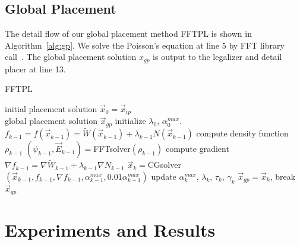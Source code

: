 \documentclass[conference,10pt]{IEEEtran}
\begin{document}
\subsection{Global Placement}
\label{subsec:gp_flow}

The detail flow of our global placement method FFTPL 
is shown in Algorithm~\ref{alg:gp}. 
We solve the Poisson's equation 
at line 5 by FFT library call~\cite{fft}. 
The global placement solution $x_{gp}$ is output to the legalizer 
and detail placer at line 13. 
\begin{algorithm}
\caption{FFTPL}
\label{alg:gp}
\begin{algorithmic}[1]
\REQUIRE 
initial placement solution $\vec{x}_0=\vec{x}_{ip}$ \\
\ENSURE
global placement solution $\vec{x}_{gp}$
\STATE initialize $\lambda_0$, $\alpha^{max}_0$. 
\STATE $f_{k-1}=f(\vec{x}_{k-1})=\widetilde{W}(\vec{x}_{k-1})+\lambda_{k-1} N(\vec{x}_{k-1})$
\STATE compute density function $\rho_{k-1}$
\STATE $(\psi_{k-1},\vec{E}_{k-1})=$FFTsolver$(\rho_{k-1})$
\STATE compute gradient $\nabla f_{k-1}=\nabla\widetilde{W}_{k-1}+\lambda_{k-1}\nabla N_{k-1}$
\STATE $\vec{x}_{k}=$CGsolver$\left(\vec{x}_{k-1},f_{k-1},\nabla f_{k-1},\alpha^{max}_{k-1},0.01\alpha^{max}_{k-1}\right)$
\STATE update $\alpha_k^{max}$, $\lambda_k$, $\tau_k$, $\gamma_k$  \STATE $\vec{x}_{gp}=\vec{x}_{k}$, break 
\ENDIF
\ENDFOR
{} $\vec{x}_{gp}$
\end{algorithmic}
\end{algorithm}










\section{Experiments and Results}
\label{sec:exp}
\end{document}
